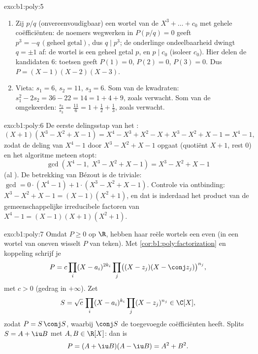 \begin{solution}{exo:b1:poly:5}
\begin{enumerate}
  \item Zij $p/q$ (onvereenvoudigbaar) een wortel van de  $X^3 + \dots + c_0$ met gehele coëfficiënten: de
        noemers wegwerken in $P(p/q) = 0$ geeft $p^3 = -q\,(\text{geheel
        getal})$, dus $q \mid p^3$; de onderlinge ondeelbaarheid dwingt
        $q = \pm 1$ af: de wortel is een geheel getal $p$, en $p \mid
        c_0$ (isoleer $c_0$). Hier delen de kandidaten $6$: toetsen
        geeft $P(1) = 0$, $P(2) = 0$, $P(3) = 0$. Dus $P =
        (X-1)(X-2)(X-3)$.
  \item Vieta: $s_1 = 6$, $s_2 = 11$, $s_3 = 6$. Som van de kwadraten:
        $s_1^2 - 2s_2 = 36 - 22 = 14 = 1 + 4 + 9$, zoals verwacht. Som
        van de omgekeerden: $\frac{s_2}{s_3} = \frac{11}{6} = 1 +
        \frac12 + \frac13$, zoals verwacht.
\end{enumerate}
\end{solution}

\begin{solution}{exo:b1:poly:6}
De eerste delingsstap van het :
\[
(X + 1)(X^3 - X^2 + X - 1)
= X^4 - X^3 + X^2 - X + X^3 - X^2 + X - 1 = X^4 - 1 ,
\]
zodat de deling van $X^4 - 1$ door $X^3 - X^2 + X - 1$ opgaat (quotiënt
$X + 1$, rest $0$) en het algoritme meteen stopt:
\[
\gcd(X^4 - 1,\; X^3 - X^2 + X - 1) = X^3 - X^2 + X - 1
\]
(al ). De betrekking van Bézout is de triviale: $\gcd = 0 \cdot
(X^4 - 1) + 1 \cdot (X^3 - X^2 + X - 1)$. Controle via ontbinding: $X^3 -
X^2 + X - 1 = (X - 1)(X^2 + 1)$, en dat is inderdaad het product van de
gemeenschappelijke irreducibele factoren van $X^4 - 1 =
(X-1)(X+1)(X^2+1)$.
\end{solution}

\begin{solution}{exo:b1:poly:7}
Omdat $P \geq 0$ op $\R$, hebben haar reële wortels een even
 (in een wortel van oneven  wisselt $P$ van
teken). Met \cref{cor:b1:poly:factorization} en koppeling schrijf je
\[
P = c \prod_i (X - a_i)^{2k_i} \prod_j \bigl((X - z_j)(X - \conj
z_j)\bigr)^{n_j},
\]
met $c > 0$ (gedrag in $+\infty$). Zet
\[
S = \sqrt c\, \prod_i (X - a_i)^{k_i} \prod_j (X - z_j)^{n_j}
\in \C[X],
\]
zodat $P = S\,\conj S$, waarbij $\conj S$ de toegevoegde coëfficiënten
heeft. Splits $S = A + \iu B$ met $A, B \in \R[X]$: dan is
\[
P = (A + \iu B)(A - \iu B) = A^2 + B^2 .
\]
\end{solution}

